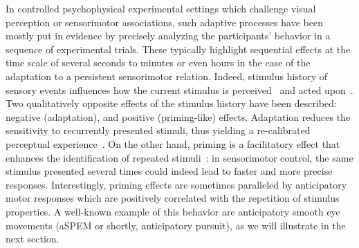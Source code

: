 \documentclass[10pt,letterpaper]{article}
\newcommand{\citep}[1]{\cite{#1}}
\newcommand{\Rone}[1]{\textbf{\textcolor{magenta}{[rev 1: #1]}}}
\newcommand{\AM}[1]{\textbf{\textcolor{blue}{[AM: #1]}}}
\begin{document}
In controlled psychophysical experimental settings which challenge visual perception or sensorimotor associations,
such adaptive processes have been mostly put in evidence
by precisely analyzing the participants' behavior in a sequence of experimental trials.
These typically highlight sequential effects
at the time scale of several seconds to minutes
or even hours in the case of the adaptation to a persistent sensorimotor relation.
Indeed, stimulus history of sensory events influences
how the current stimulus is perceived~\citep{Sotiropoulos2011,Adams12,ChopinMamassian2012,FischerWhitney2014,Cicchini_PRSB_2018} and
acted upon~\citep{WallmanFuchs1998,Carpenter1995, Maus2015,Damasse18}.
Two qualitatively opposite effects of the stimulus history have been described:
negative (adaptation), and positive (priming-like) effects.
Adaptation reduces the sensitivity to recurrently presented stimuli,
thus yielding a re-calibrated perceptual experience~\citep{Clifford2007, Webster2011, Kohn2007}.
On the other hand, priming is a facilitatory effect that
enhances the identification of repeated stimuli~\citep{Verstraten1994, Tiest2009}:
in sensorimotor control,
the same stimulus presented several times could indeed
lead to faster and more precise responses. 
Interestingly, priming effects %
are sometimes paralleled by anticipatory motor responses
which are positively correlated with the repetition of stimulus properties.
A well-known example of this behavior
are anticipatory smooth eye movements (aSPEM or shortly, anticipatory pursuit),
as we will illustrate in the next section.
\end{document}

